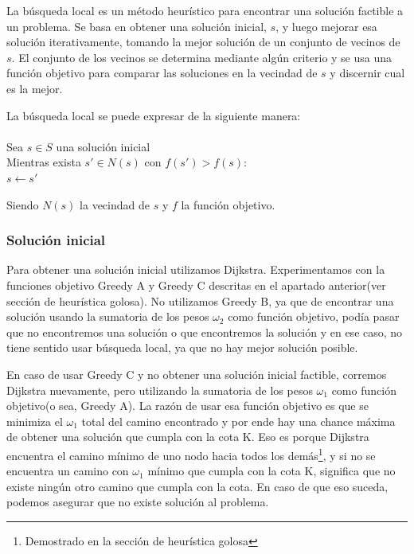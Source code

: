 La búsqueda local es un método heurístico para encontrar una solución factible a un problema. Se basa en obtener una solución inicial, $s$, y luego mejorar esa solución iterativamente, tomando la mejor solución de un conjunto de vecinos de $s$. El conjunto de los vecinos se determina mediante algún criterio y se usa una función objetivo para comparar las soluciones en la vecindad de $s$ y discernir cual es la mejor.

La búsqueda local se puede expresar de la siguiente manera:\\\\
\hspace*{1 cm} Sea $s \in S$ una solución inicial\\
\hspace*{1 cm} Mientras exista $s' \in N(s)$ con $f(s') > f(s)$:\\
\hspace*{2 cm} $s \leftarrow s'$

Siendo $N(s)$ la vecindad de $s$ y $f$ la función objetivo.

\subsubsection{Solución inicial}

Para obtener una solución inicial utilizamos Dijkstra. Experimentamos con la funciones objetivo Greedy A y Greedy C descritas en el apartado anterior(ver sección de heurística golosa). No utilizamos Greedy B, ya que de encontrar una solución usando la sumatoria de los pesos $\omega_2$ como función objetivo, podía pasar que no encontremos una solución o que encontremos la solución y en ese caso, no tiene sentido usar búsqueda local, ya que no hay mejor solución posible.

En caso de usar Greedy C y no obtener una solución inicial factible, corremos Dijkstra nuevamente, pero utilizando la sumatoria de los pesos $\omega_1$ como función objetivo(o sea, Greedy A). La razón de usar esa función objetivo es que se minimiza el $\omega_1$ total del camino encontrado y por ende hay una chance máxima de obtener una solución que cumpla con la cota K. Eso es porque Dijkstra encuentra el camino mínimo de uno nodo hacia todos los demás\footnote{Demostrado en la sección de heurística golosa}, y si no se encuentra un camino con $\omega_1$ mínimo que cumpla con la cota K, significa que no existe ningún otro camino que cumpla con la cota. En caso de que eso suceda, podemos asegurar que no existe solución al problema.


